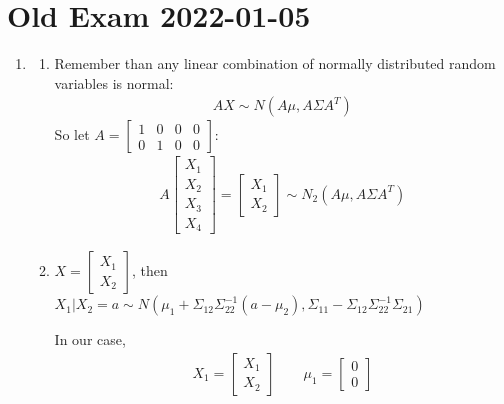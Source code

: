 \section{Old Exam 2022-01-05}
\begin{enumerate}[label=\arabic*.,leftmargin=*]
  \item\par\bigskip
    \begin{enumerate}[label=\alph*),leftmargin=*]
      \item Remember than any linear combination of normally distributed random variables is normal:
        \begin{equation*}
          \begin{gathered}
            AX\sim N(A\mu,A\Sigma A^T)
          \end{gathered}
        \end{equation*}
        So let $A = \begin{bmatrix}1&0&0&0\\0&1&0&0\end{bmatrix}$:
        \begin{equation*}
          \begin{gathered}
            A\begin{bmatrix}X_1\\X_2\\X_3\\X_4\end{bmatrix} = \begin{bmatrix}X_1\\X_2\end{bmatrix}\sim N_2(A\mu,A\Sigma A^T)
          \end{gathered}
        \end{equation*}
        \par\bigskip
      \item $X = \begin{bmatrix}X_1\\X_2\end{bmatrix}$, then $X_1|X_2 = a\sim N(\mu_1+\Sigma_{12}\Sigma_{22}^{-1}(a-\mu_2), \Sigma_{11}-\Sigma_{12}\Sigma_{22}^{-1}\Sigma_{21})$
        \par\bigskip
        \noindent In our case,
        \begin{equation*}
          \begin{gathered}
            X_1 = \begin{bmatrix}X_1\\X_2\end{bmatrix}\qquad \mu_1 = \begin{bmatrix}0\\0\end{bmatrix}\\

\end{gathered}
\end{equation*}
\end{enumerate}
\end{enumerate}
